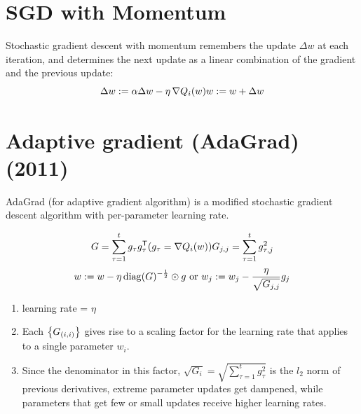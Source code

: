 

\section{SGD with Momentum \cite{wiki-Stochastic_gradient_descent}}\label{SGD with Momentum}
Stochastic gradient descent with momentum remembers the update $\Delta w$ at each iteration, and determines the next update as a linear combination of the gradient and the previous update:
\[
    {\displaystyle \Delta w:=\alpha \Delta w-\eta \,\nabla Q_{i}(w)}
    \hfill
    {\displaystyle w:=w+\Delta w}
\]




\section{Adaptive gradient (AdaGrad) (2011) \cite{wiki-Stochastic_gradient_descent}}\label{Adaptive gradient (AdaGrad)}
AdaGrad (for adaptive gradient algorithm) is a modified stochastic gradient descent algorithm with per-parameter learning rate.

\[
    {\displaystyle G=\sum _{\tau =1}^{t}g_{\tau }g_{\tau }^{\mathsf {T}}}
    \hfill
    ({\displaystyle g_{\tau }=\nabla Q_{i}(w)})
    \hfill
    {\displaystyle G_{j,j}=\sum _{\tau =1}^{t}g_{\tau ,j}^{2}}
\]
\[
    {\displaystyle w:=w-\eta \,\mathrm {diag} (G)^{-{\frac {1}{2}}}\odot g} 
    \hfill \text{ or } \hfill
    {\displaystyle w_{j}:=w_{j}-{\frac {\eta }{\sqrt {G_{j,j}}}}g_{j}}
\]

\begin{enumerate}
    \item learning rate = $\eta$

    \item Each $\left\{G_{(i,i)}\right\}$ gives rise to a scaling factor for the learning rate that applies to a single parameter $w_i$.

    \item Since the denominator in this factor, ${\displaystyle {\sqrt {G_{i}}}={\sqrt {\sum _{\tau =1}^{t}g_{\tau }^{2}}}}$ is the $l_2$ norm of previous derivatives, extreme parameter updates get dampened, while parameters that get few or small updates receive higher learning rates.    
\end{enumerate}



